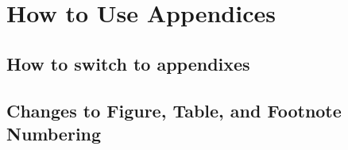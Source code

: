 \chapter{How to Use Appendices}


\section{How to switch to appendixes}


\section{Changes to Figure, Table, and Footnote Numbering}

